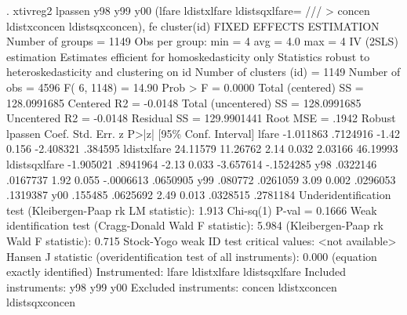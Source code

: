 . xtivreg2 lpassen y98 y99 y00 (lfare ldistxlfare ldistsqxlfare= ///
> concen ldistxconcen ldistsqxconcen), fe cluster(id)
{\smallskip}
FIXED EFFECTS ESTIMATION
Number of groups =      1149                    Obs per group: min =         4
                                                               avg =       4.0
                                                               max =         4
{\smallskip}
IV (2SLS) estimation
{\smallskip}
Estimates efficient for homoskedasticity only
Statistics robust to heteroskedasticity and clustering on id
{\smallskip}
Number of clusters (id) =         1149                Number of obs =     4596
                                                      F(  6,  1148) =    14.90
                                                      Prob > F      =   0.0000
Total (centered) SS     =  128.0991685                Centered R2   =  -0.0148
Total (uncentered) SS   =  128.0991685                Uncentered R2 =  -0.0148
Residual SS             =  129.9901441                Root MSE      =    .1942
{\smallskip}
              {\VBAR}               Robust
      lpassen {\VBAR}      Coef.   Std. Err.      z    P>|z|     [95\% Conf. Interval]
        lfare {\VBAR}  -1.011863   .7124916    -1.42   0.156    -2.408321     .384595
  ldistxlfare {\VBAR}   24.11579   11.26762     2.14   0.032      2.03166    46.19993
ldistsqxlfare {\VBAR}  -1.905021   .8941964    -2.13   0.033    -3.657614   -.1524285
          y98 {\VBAR}   .0322146   .0167737     1.92   0.055    -.0006613    .0650905
          y99 {\VBAR}    .080772   .0261059     3.09   0.002     .0296053    .1319387
          y00 {\VBAR}    .155485   .0625692     2.49   0.013     .0328515    .2781184
Underidentification test (Kleibergen-Paap rk LM statistic):              1.913
                                                   Chi-sq(1) P-val =    0.1666
Weak identification test (Cragg-Donald Wald F statistic):                5.984
                         (Kleibergen-Paap rk Wald F statistic):          0.715
Stock-Yogo weak ID test critical values:                       <not available>
Hansen J statistic (overidentification test of all instruments):         0.000
                                                 (equation exactly identified)
Instrumented:         lfare ldistxlfare ldistsqxlfare
Included instruments: y98 y99 y00
Excluded instruments: concen ldistxconcen ldistsqxconcen
{\smallskip}
